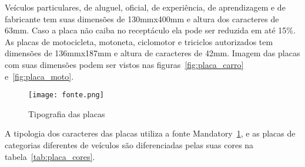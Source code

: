 Veículos particulares, de aluguel, oficial, de experiência, de aprendizagem e de
fabricante tem suas dimensões de 130mmx400mm e altura dos caracteres de 63mm.
Caso a placa não caiba no receptáculo ela pode ser reduzida em até 15\%. As
placas de motocicleta, motoneta, ciclomotor e triciclos autorizados tem
dimensões de 136mmx187mm e altura de caracteres de 42mm. Imagem das placas com
suas dimensões podem ser vistos nas figuras~\ref{fig:placa_carro}
e~\ref{fig:placa_moto}. 

\begin{figure}[H]
		\centering
		\texttt{[image: fonte.png]}
		\caption{Tipografia das placas}
		\label{fig:tipografia}
\end{figure}


A tipologia dos caracteres das placas utiliza a fonte
Mandatory~\ref{fig:tipografia}, e as placas de categorias diferentes de
veículos são diferenciadas pelas suas cores na tabela~\ref{tab:placa_cores}.

